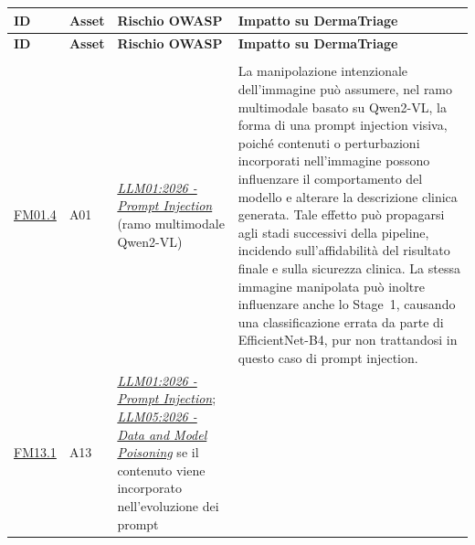 {
\small
{}
\setlength{\tabcolsep}{4pt}
\renewcommand{\arraystretch}{1.08}

\begin{xltabular}{\textwidth}{
    >{\raggedright\arraybackslash}p{1.1cm}
    >{\raggedright\arraybackslash}p{1.1cm}
    >{\raggedright\arraybackslash}p{4.3cm}
    X
}

\toprule

\textbf{ID} &
\textbf{Asset} &
\textbf{Rischio OWASP} &
\textbf{Impatto su DermaTriage} \\

\midrule

\endfirsthead

\toprule

\textbf{ID} &
\textbf{Asset} &
\textbf{Rischio OWASP} &
\textbf{Impatto su DermaTriage} \\

\midrule

\endhead

 \\
\endfoot

\endlastfoot


\hyperlink{fm01-4}{FM01.4} &

A01 &

\href{https://genai.owasp.org/resource/owasp-genai-llm-top-10-2026/}
{\textit{LLM01:2026 - Prompt Injection}}
(ramo multimodale Qwen2-VL) &

La manipolazione intenzionale dell'immagine può assumere, nel ramo multimodale
basato su Qwen2-VL, la forma di una prompt injection visiva, poiché contenuti o
perturbazioni incorporati nell'immagine possono influenzare il comportamento del
modello e alterare la descrizione clinica generata. Tale effetto può propagarsi
agli stadi successivi della pipeline, incidendo sull'affidabilità del risultato
finale e sulla sicurezza clinica. La stessa immagine manipolata può inoltre
influenzare anche lo Stage~1, causando una classificazione errata da parte di
EfficientNet-B4, pur non trattandosi in questo caso di prompt injection. \\

\midrule


\hyperlink{fm13-1}{FM13.1} &

A13 &

\href{https://genai.owasp.org/resource/owasp-genai-llm-top-10-2026/}
{\textit{LLM01:2026 - Prompt Injection}};
\href{https://genai.owasp.org/resource/owasp-genai-llm-top-10-2026/}
{\textit{LLM05:2026 - Data and Model Poisoning}}
se il contenuto viene incorporato nell'evoluzione dei prompt &


\end{xltabular}}
